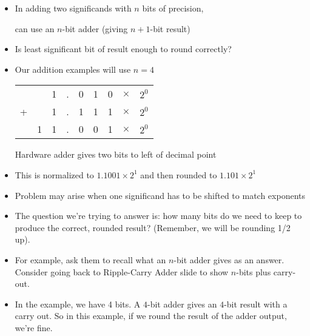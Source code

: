 \begin{frame}[fragile]
\begin{itemize}
  \item In adding two significands with $n$ bits of precision, 

	can use an $n$-bit adder (giving $n+1$-bit result)
  \item Is least significant bit of result enough to round correctly?
  \item Our addition examples will use $n=4$

\begin{center}
\begin{tabular}{ccccccccc }
  &   & 1 & . & 0 & 1 & 0 & $\times$ & $2^0$ \\
+ &   & 1 & . & 1 & 1 & 1 & $\times$ & $2^0$ \\ \hline
  & 1 & 1 & . & 0 & 0 & 1 & $\times$ & $2^0$ \\
\end{tabular}
\end{center}

Hardware adder gives two bits to left of decimal point
\item This is normalized to $1.1001 \times 2^1$ and then
  rounded to $1.101 \times 2^1$
\item Problem may arise when one significand has to be shifted to match
  exponents 
\end{itemize}

\BNotes\ifnum{}
\begin{itemize}
	\item The question we're trying to answer is: how many bits do we need
		to keep to produce the correct, rounded result?
		(Remember, we will be rounding 1/2 up).
	\item For example, ask them to recall what an $n$-bit adder gives as
		an answer.  Consider going back to Ripple-Carry Adder slide
		to show $n$-bits plus carry-out.
	\item In the example, we have 4 bits.  A $4$-bit adder
		gives an $4$-bit result with a carry out.  So in this
		example, if we round the result of the adder output, we're fine.
\end{itemize}
\fi\ENotes
\end{frame}

